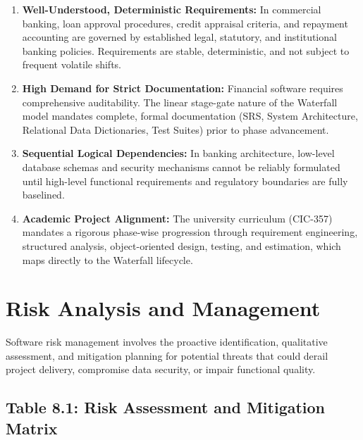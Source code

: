 \documentclass[12pt,a4paper,oneside]{report}
\begin{document}
\begin{enumerate}
  \item \textbf{Well-Understood, Deterministic Requirements:} In commercial banking, loan approval procedures, credit appraisal criteria, and repayment accounting are governed by established legal, statutory, and institutional banking policies. Requirements are stable, deterministic, and not subject to frequent volatile shifts.
  \item \textbf{High Demand for Strict Documentation:} Financial software requires comprehensive auditability. The linear stage-gate nature of the Waterfall model mandates complete, formal documentation (SRS, System Architecture, Relational Data Dictionaries, Test Suites) prior to phase advancement.
  \item \textbf{Sequential Logical Dependencies:} In banking architecture, low-level database schemas and security mechanisms cannot be reliably formulated until high-level functional requirements and regulatory boundaries are fully baselined.
  \item \textbf{Academic Project Alignment:} The university curriculum (CIC-357) mandates a rigorous phase-wise progression through requirement engineering, structured analysis, object-oriented design, testing, and estimation, which maps directly to the Waterfall lifecycle.
\end{enumerate}

\section{Risk Analysis and Management}

Software risk management involves the proactive identification, qualitative assessment, and mitigation planning for potential threats that could derail project delivery, compromise data security, or impair functional quality.

\subsection{Table 8.1: Risk Assessment and Mitigation Matrix}
\end{document}
